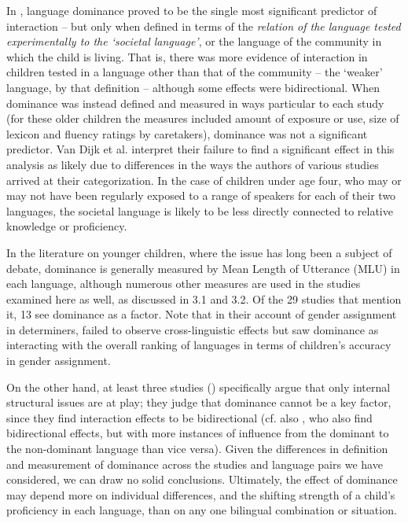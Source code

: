 \documentclass[output=paper]{langscibook}
\begin{document}
In \citet{VanDijkEtAl2022}, language dominance proved to be the single most significant predictor of interaction – but only when defined in terms of the \textit{relation of the language tested experimentally to the ‘societal language’}, or the language of the community in which the child is living. That is, there was more evidence of interaction in children tested in a language other than that of the community – the ‘weaker’ language, by that definition – although some effects were bidirectional. When dominance was instead defined and measured in ways particular to each study (for these older children the measures included amount of exposure or use, size of lexicon and fluency ratings by caretakers), dominance was not a significant predictor. Van Dijk et al. interpret their failure to find a significant effect in this analysis as likely due to differences in the ways the authors of various studies arrived at their categorization. In the case of children under age four, who may or may not have been regularly exposed to a range of speakers for each of their two languages, the societal language is likely to be less directly connected to relative knowledge or proficiency.

In the literature on younger children, where the issue has long been a subject of debate, dominance is generally measured by Mean Length of Utterance (MLU) in each language, although numerous other measures are used in the studies examined here as well, as discussed in 3.1 and 3.2. Of the 29 studies that mention it, 13 see dominance as a factor. Note that in their account of gender assignment in determiners, \citet{EichlerEtAl2013} failed to observe cross-linguistic effects but saw dominance as interacting with the overall ranking of languages in terms of children's accuracy in gender assignment. 

On the other hand, at least three studies (\citealt{AndersenBentzen2018,HulkMüller2000,Muller2001}) specifically argue that only internal structural issues are at play; they judge that dominance cannot be a key factor, since they find interaction effects to be bidirectional (cf. also \citealt{AdnyaniEtAl2018}, who also find bidirectional effects, but with more instances of influence from the dominant to the non-dominant language than vice versa). Given the differences in definition and measurement of dominance across the studies and language pairs we have considered, we can draw no solid conclusions. Ultimately, the effect of dominance may depend more on individual differences, and the shifting strength of a child’s proficiency in each language, than on any one bilingual combination or situation.
\end{document}
